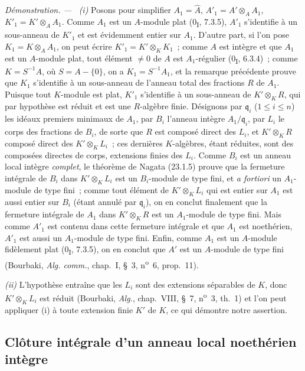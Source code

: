 \documentclass[10pt,oneside]{book}
\newcommand{\oldpage}[2][]{%
  \setcounter{footnote}{0}%
  \marginpar{\scriptsize\textbf{#1}~|~#2}\ignorespaces}
\newenvironment{proof}{%
  \par\medskip\noindent\textit{Démonstration. ---\ }}{\par}
\begin{document}
\begin{proof}
\emph{(i)} Posons pour simplifier $A_1=\widehat A$,
$A'_1=A'\otimes_AA_1$, $K'_1=K'\otimes_AA_1$. Comme $A_1$ est un
$A$-module plat (0\textsubscript{I}, 7.3.5), $A'_1$ s'identifie à un
sous-anneau de $K'_1$ et est évidemment entier sur $A_1$. D'autre part, si
l'on pose $K_1=K\otimes_AA_1$, on peut écrire
$K'_1=K'\otimes_KK_1$~; comme $A$ est intègre et que $A_1$ est un $A$-module
plat, tout élément $\neq0$ de $A$ est $A_1$-régulier
(0\textsubscript{I}, 6.3.4)~; comme $K=S^{-1}A$, où $S=A-\{0\}$, on a
$K_1=S^{-1}A_1$, et la remarque précédente prouve que $K_1$ s'identifie à un
sous-anneau de l'anneau total des fractions $R$ de $A_1$. Puisque tout
$K$-module est plat, $K'_1$ s'identifie à un sous-anneau de $K'\otimes_KR$,
qui par hypothèse est réduit et est une $R$-algèbre finie. Désignons par
$\mathfrak q_i$ ($1\leqslant i\leqslant n$) les idéaux premiers minimaux de
$A_1$, par $B_i$ l'anneau intègre $A_1/\mathfrak q_i$, par $L_i$ le corps des
fractions de $B_i$, de sorte que $R$ est composé direct des $L_i$, et
$K'\otimes_KR$ composé direct des $K'\otimes_KL_i$~; ces dernières
$K$-algèbres, étant réduites, sont des composées directes de corps,
extensions finies des $L_i$. Comme $B_i$ est un anneau local intègre
\emph{complet}, le théorème de Nagata (23.1.5) prouve que la fermeture
intégrale de $B_i$ dans $K'\otimes_KL_i$ est un $B_i$-module de type fini, et
\emph{a fortiori} un $A_1$-module de type fini~; comme tout élément de
$K'\otimes_KL_i$ qui est entier sur $A_1$ est aussi entier sur $B_i$ (étant
annulé par $\mathfrak q_i$), on en conclut finalement que la fermeture
intégrale de $A_1$ dans $K'\otimes_KR$ est un $A_1$-module de type fini. Mais
comme $A'_1$ est contenu dans cette fermeture intégrale et que $A_1$ est
noethérien, $A'_1$ est aussi un $A_1$-module de type fini. Enfin, comme $A_1$
est un $A$-module fidèlement plat (0\textsubscript{I}, 7.3.5), on en conclut
que $A'$ est un $A$-module de type fini (Bourbaki, \emph{Alg. comm.},
chap.~I, §~3, n\textsuperscript{o}~6, prop.~11).

\oldpage[0\textsubscript{IV-1}]{217}

\emph{(ii)} L'hypothèse entraîne que les $L_i$ sont des extensions séparables
de $K$, donc $K'\otimes_KL_i$ est réduit (Bourbaki, \emph{Alg.}, chap.~VIII,
§~7, n\textsuperscript{o}~3, th.~1) et l'on peut appliquer (i) à toute
extension finie $K'$ de $K$, ce qui démontre notre assertion.
\end{proof}

\subsection{Clôture intégrale d'un anneau local noethérien intègre}
\label{subsection:0.23.2-fr}
\end{document}
